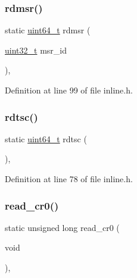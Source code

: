 \subsubsection{\texorpdfstring{rdmsr()}{rdmsr()}}
{\footnotesize\ttfamily static \hyperlink{a00023_aa232ecf786a74ce5363c36c10798d2b1_aa232ecf786a74ce5363c36c10798d2b1}{uint64\+\_\+t} rdmsr (\begin{DoxyParamCaption}\item[{\hyperlink{a00023_a435d1572bf3f880d55459d9805097f62_a435d1572bf3f880d55459d9805097f62}{uint32\+\_\+t}}]{msr\+\_\+id }\end{DoxyParamCaption})\hspace{0.3cm}{\ttfamily [inline]}, {\ttfamily [static]}}



Definition at line 99 of file inline.\+h.

\mbox{\label{a00026_a47b9d70be3022fd0b5687d9794ca47bc_a47b9d70be3022fd0b5687d9794ca47bc}} 
\subsubsection{\texorpdfstring{rdtsc()}{rdtsc()}}
{\footnotesize\ttfamily static \hyperlink{a00023_aa232ecf786a74ce5363c36c10798d2b1_aa232ecf786a74ce5363c36c10798d2b1}{uint64\+\_\+t} rdtsc (\begin{DoxyParamCaption}{ }\end{DoxyParamCaption})\hspace{0.3cm}{\ttfamily [inline]}, {\ttfamily [static]}}



Definition at line 78 of file inline.\+h.

\mbox{\label{a00026_ac85e095222f364961e091702bb6bc2ff_ac85e095222f364961e091702bb6bc2ff}} 
\subsubsection{\texorpdfstring{read\+\_\+cr0()}{read\_cr0()}}
{\footnotesize\ttfamily static unsigned long read\+\_\+cr0 (\begin{DoxyParamCaption}\item[{void}]{ }\end{DoxyParamCaption})\hspace{0.3cm}{\ttfamily [inline]}, {\ttfamily [static]}}



